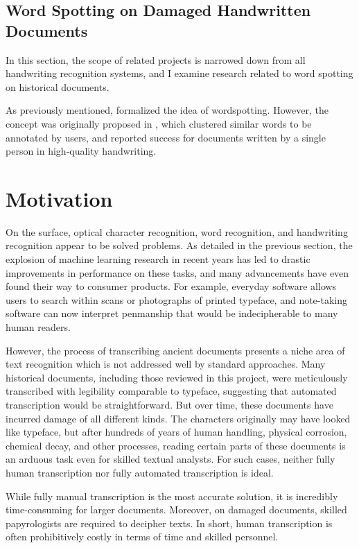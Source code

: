 \documentclass[final]{ukthesis}
\begin{document}
\subsection{Word Spotting on Damaged Handwritten Documents}
In this section, the scope of related projects is narrowed down from all handwriting recognition systems, and I examine research related to word spotting on historical documents.

As previously mentioned, \cite{rath2007word} formalized the idea of wordspotting. However, the concept was originally proposed in \cite{manmatha1996word}, which clustered similar words to be annotated by users, and reported success for documents written by a single person in high-quality handwriting.





\section{Motivation}
On the surface, optical character recognition, word recognition, and handwriting recognition appear to be solved problems. As detailed in the previous section, the explosion of machine learning research in recent years has led to drastic improvements in performance on these tasks, and many advancements have even found their way to consumer products. For example, everyday software allows users to search within scans or photographs of printed typeface, and note-taking software can now interpret penmanship that would be indecipherable to many human readers.

However, the process of transcribing ancient documents presents a niche area of text recognition which is not addressed well by standard approaches. Many historical documents, including those reviewed in this project, were meticulously transcribed with legibility comparable to typeface, suggesting that automated transcription would be straightforward. But over time, these documents have incurred damage of all different kinds. The characters originally may have looked like typeface, but after hundreds of years of human handling, physical corrosion, chemical decay, and other processes, reading certain parts of these documents is an arduous task even for skilled textual analysts. For such cases, neither fully human transcription nor fully automated transcription is ideal.

While fully manual transcription is the most accurate solution, it is incredibly time-consuming for larger documents. Moreover, on damaged documents, skilled papyrologists are required to decipher texts. In short, human transcription is often prohibitively costly in terms of time and skilled personnel.
\end{document}
